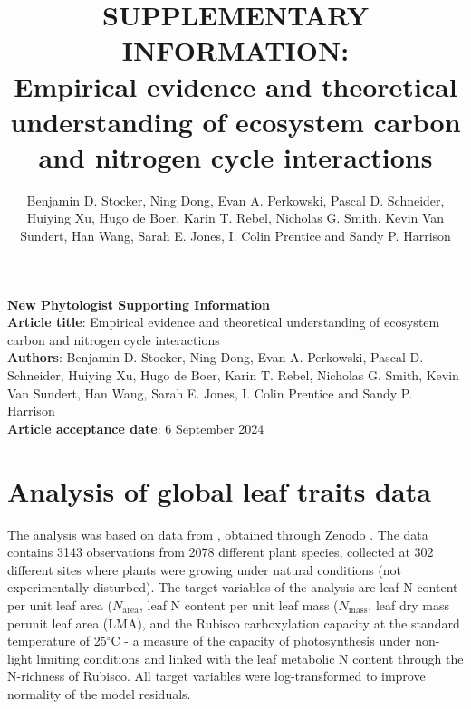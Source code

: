 \documentclass{myreport}
\begin{document}
\pagestyle{headings}

\renewcommand{\thefigure}{\arabic{figure}}
\renewcommand{\thetable}{\arabic{table}}
\renewcommand{\thesection}{Notes S\arabic{section}}
\renewcommand{\theequation}{\arabic{equation}}

\setcounter{section}{2}

% 

\title{SUPPLEMENTARY INFORMATION:\\
Empirical evidence and theoretical understanding of ecosystem carbon and nitrogen cycle interactions}
\author{Benjamin D. Stocker, Ning Dong, Evan A. Perkowski, Pascal D. Schneider,
Huiying Xu, Hugo de Boer, Karin T. Rebel, Nicholas G. Smith, Kevin Van Sundert, Han Wang, Sarah E. Jones, I. Colin Prentice and Sandy P. Harrison} 

{\selectfont
\noindent \textbf{New Phytologist Supporting Information} \\
\textbf{Article title}: Empirical evidence and theoretical understanding of ecosystem carbon and nitrogen cycle interactions\\
\textbf{Authors}: Benjamin D. Stocker, Ning Dong, Evan A. Perkowski, Pascal D. Schneider,
Huiying Xu, Hugo de Boer, Karin T. Rebel, Nicholas G. Smith, Kevin Van Sundert, Han Wang, Sarah E. Jones, I. Colin Prentice and Sandy P. Harrison\\
\textbf{Article acceptance date}: 6 September 2024 \\
}


\section{Analysis of global leaf traits data}

The analysis was based on data from \citet{dong22jecol}, obtained through Zenodo \citep{dong22zenodo}. The data contains 3143 observations from 2078 different plant species, collected at 302 different sites where plants were growing under natural conditions (not experimentally disturbed). The target variables of the analysis are leaf N content per unit leaf area ($N_\text{area}$, leaf N content per unit leaf mass ($N_\text{mass}$, leaf dry mass perunit leaf area (LMA), and the Rubisco carboxylation capacity at the standard temperature of 25$^\circ$C - a measure of the capacity of photosynthesis under non-light limiting conditions and linked with the leaf metabolic N content through the N-richness of Rubisco. All target variables were log-transformed to improve normality of the model residuals. 
\end{document}
